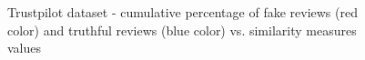 \begin{figure}[ht]
\begin{center}
{\label{fig:cdf_trustpilot_cosineposnonlemmatized}}
\caption{Trustpilot dataset - cumulative percentage of fake reviews (red color) and truthful reviews (blue color) vs. similarity measures values}    
\label{fig:cdf_trustpilot}
\end{center}
\end{figure}

